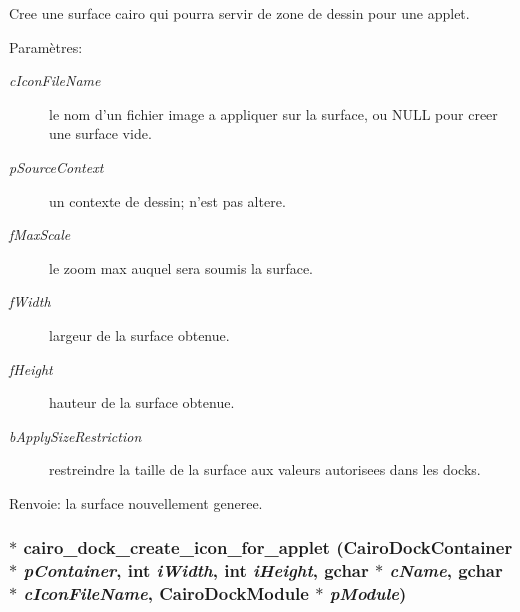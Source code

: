 Cree une surface cairo qui pourra servir de zone de dessin pour une applet. \begin{Desc}
\item[Paramètres:]
\begin{description}
\item[{\em cIconFileName}]le nom d'un fichier image a appliquer sur la surface, ou NULL pour creer une surface vide. \item[{\em pSourceContext}]un contexte de dessin; n'est pas altere. \item[{\em fMaxScale}]le zoom max auquel sera soumis la surface. \item[{\em fWidth}]largeur de la surface obtenue. \item[{\em fHeight}]hauteur de la surface obtenue. \item[{\em bApplySizeRestriction}]restreindre la taille de la surface aux valeurs autorisees dans les docks. \end{description}
\end{Desc}
\begin{Desc}
\item[Renvoie:]la surface nouvellement generee. \end{Desc}
\subsubsection{$\ast$ cairo\_\-dock\_\-create\_\-icon\_\-for\_\-applet ({\bf CairoDockContainer} $\ast$ {\em pContainer}, int {\em iWidth}, int {\em iHeight}, gchar $\ast$ {\em cName}, gchar $\ast$ {\em cIconFileName}, {\bf CairoDockModule} $\ast$ {\em pModule})}\label{cairo-dock-applet-factory_8h_32a4b2bfcc94203e18a69c14d351db01}


